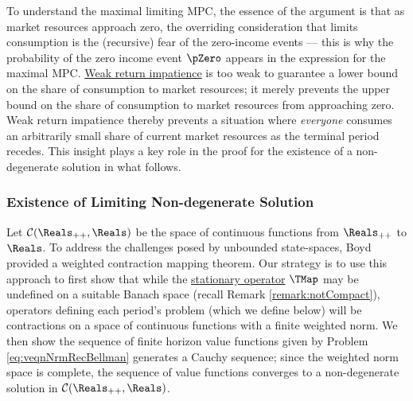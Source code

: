 \documentclass[BufferStockTheory]{subfiles}
\begin{document}

To understand the maximal limiting MPC, the essence of the argument is that as market resources approach zero, the overriding consideration that limits consumption is the (recursive) fear of the zero-income events --- this is why the probability of the zero income event $\pZero$ appears in the expression for the maximal MPC.
\hyperlink{WRIC}{Weak return impatience} is too weak to guarantee a lower bound on the share of consumption to market resources; it merely prevents the upper bound on the share of consumption to market resources from approaching zero.
Weak return impatience thereby prevents a situation where \textit{everyone} consumes an arbitrarily small share of current market resources as the terminal period recedes.
This insight plays a key role in the proof for the existence of a non-degenerate solution in what follows.



\begin{comment}
Next, define the `Value of Autarky Factor:'\hypertarget{VAFacDefn}{} 

$DiscFac \PermGroFac^{1-\CRRA}\Ex(\permShk^{1-\CRRA})$
\end{align}

\end{comment}


\hypertarget{Conditions-Under-Which-the-Problem-Defines-a-Contraction-Mapping}{}
\subsubsection{Existence of Limiting Non-degenerate Solution}\label{subsubsec:eventuallyCauchy}

Let $\mathcal{C}(\Reals_{++},\Reals)$ be the space of continuous functions from $\Reals_{++}$ to $\Reals$. To address the challenges posed by unbounded state-spaces, Boyd~\citeyearpar{jboydWeighted} provided a weighted contraction mapping theorem.
Our strategy is to use this approach to first show that while the \hyperlink{Stationary-Bellman-Operator}{stationary operator} $\TMap$ may be undefined on a suitable Banach space (recall Remark \ref{remark:notCompact}), operators defining each period's problem (which we define below) will be contractions on a space of continuous functions with a finite weighted norm. We then show the sequence of finite horizon value functions given by Problem \eqref{eq:veqnNrmRecBellman} generates a Cauchy sequence; since the weighted norm space is complete, the sequence of value functions converges to a non-degenerate solution in $\mathcal{C}(\Reals_{++},\Reals)$.
\end{document}

